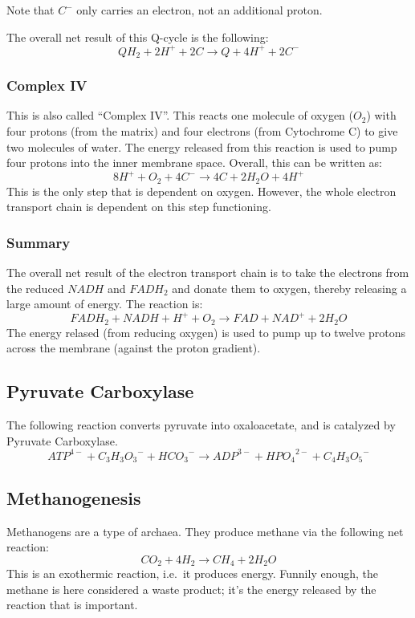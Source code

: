 \documentclass{article}
\begin{document}
Note that $C^-$ only carries an electron, not an additional proton.

The overall net result of this Q-cycle is the following:
\[
    QH_2 + 2H^+ + 2C \rightarrow Q + 4H^+ + 2C^-
\]

\subsubsection{Complex IV}
This is also called ``Complex IV''.
This reacts one molecule of oxygen ($O_2$) with four protons (from the matrix) and four
electrons (from Cytochrome C) to give two molecules of water. The energy released
from this reaction is used to pump four protons into the inner membrane space.
Overall, this can be written as:
\[
    8H^+ + O_2 + 4C^- \rightarrow 4C + 2H_2O + 4H^+
\]
This is the only step that is dependent on oxygen. However, the whole electron transport
chain is dependent on this step functioning.

\subsubsection{Summary}
The overall net result of the electron transport chain is to take the electrons from the
reduced $NADH$ and $FADH_2$ and donate them to oxygen, thereby releasing a large amount of
energy. The reaction is:
\[
    FADH_2 + NADH + H^+ + O_2 \rightarrow FAD + NAD^+ + 2H_2O
\]
The energy relased (from reducing oxygen) is used to pump up to twelve protons across the
membrane (against the proton gradient).


\subsection{Pyruvate Carboxylase}
The following reaction converts pyruvate into oxaloacetate, and is catalyzed by Pyruvate
Carboxylase.
\[
    {ATP}^{4-} + {C_3H_3O_3}^- + {HCO_3}^- \rightarrow
    {ADP}^{3-} + {HPO_4}^{2-} + {C_4H_3O_5}^-
\]

\subsection{Methanogenesis}
Methanogens are a type of archaea. They produce methane via the following net reaction:
\[
    CO_2 + 4H_2 \rightarrow CH_4 + 2H_2O
\]
This is an exothermic reaction, i.e.\ it produces energy. Funnily enough, the methane
is here considered a waste product; it's the energy released by the reaction that is
important.
\end{document}
